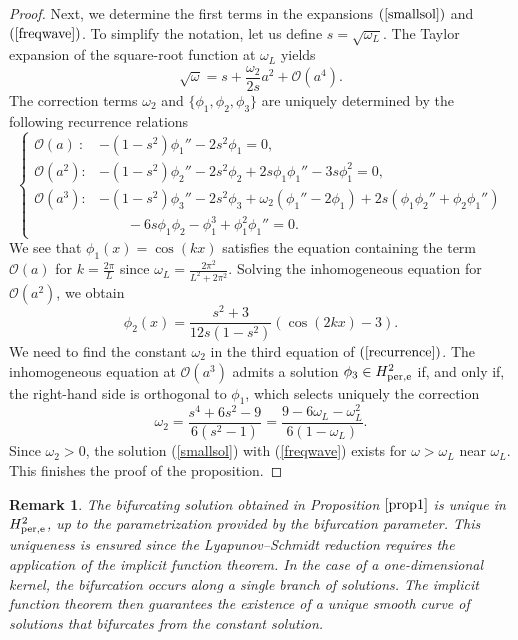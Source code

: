 \documentclass[12pt,reqno]{amsart}
\numberwithin{equation}{section}
\numberwithin{figure}{section}
\newtheorem{remark}[theorem]{Remark}
\begin{document}
\begin{proof}
Next, we determine the first terms in the expansions $(\ref{smallsol})$ and $(\ref{freqwave})$. To simplify the notation, let us define $s=\sqrt{\omega_L}$. The Taylor expansion of the square-root function at $\omega_L$ yields 
			$$
				\sqrt{\omega}=s+\frac{\omega_2}{2s}a^2+\mathcal{O}(a^4).
				$$
The correction terms $\omega_2$ and $\{ \phi_1,\phi_2,\phi_3\}$ are uniquely determined by the following recurrence relations
			 \begin{equation}\label{recurrence}\left\{\begin{array}{llllll}
					\mathcal{O}(a)\ : &-(1-s^2)\phi_1''-2s^2\phi_1=0,\\
					\mathcal{O}(a^2):&-(1-s^2)\phi_2''-2s^2\phi_2+2s\phi_1\phi_1''-3s\phi_1^2=0,\\
					\mathcal{O}(a^3): &-(1-s^2)\phi_3''-2s^2\phi_3+\omega_2(\phi_1''-2\phi_1)+2s(\phi_1\phi_2''+\phi_2\phi_1'')\\
					& \qquad -6s\phi_1\phi_2-\phi_1^3+\phi_1^2\phi_1''=0.
				\end{array}\right.\end{equation}
We see that $\phi_1(x)=\cos(kx)$ satisfies the equation containing the term $\mathcal{O}(a)$ for $k=\frac{2\pi}{L}$ since $\omega_L= \frac{2\pi^2}{L^2 + 2 \pi^2}$. Solving the inhomogeneous equation for $\mathcal{O}(a^2)$, we obtain
			$$
			\phi_2(x)=\frac{s^2+3}{12s(1-s^2)}(\cos(2kx)-3).
			$$
			We need to find the constant $\omega_2$ in the third equation of $(\ref{recurrence})$. The inhomogeneous equation at $\mathcal{O}(a^3)$ admits a solution $\phi_3 \in H^2_{\rm per,e}$ if, and only if, the right-hand side is orthogonal to $\phi_1$, which selects uniquely the
			correction 
			$$
			\omega_2 = \frac{s^4+6s^2-9}{6(s^2-1)} = \frac{9 - 6 \omega_L - \omega_L^2}{6(1-\omega_L)}.
			$$ 
Since $\omega_2 > 0$, the solution (\ref{smallsol}) with (\ref{freqwave}) exists for $\omega > \omega_L$ near $\omega_L$. This finishes the proof of the proposition.
	\end{proof}
	
	\begin{remark}
The bifurcating solution obtained in Proposition $\ref{prop1}$ is unique in $H^2_{\rm per,e}$, up to the parametrization provided by the bifurcation parameter. This uniqueness is ensured since the Lyapunov–Schmidt reduction requires the application of the implicit function theorem. In the case of a one-dimensional kernel, the bifurcation occurs along a single branch of solutions. The implicit function theorem then guarantees the existence of a unique smooth curve of solutions that bifurcates from the constant solution.
		\end{remark}
	
\end{document}
